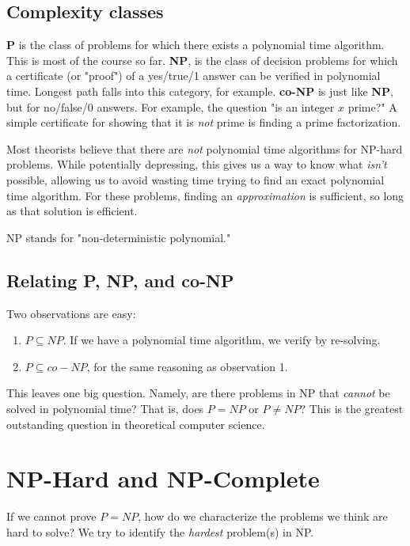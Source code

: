 \documentclass[titlepage, 12pt, leqno]{article}
\begin{document}
\subsection{Complexity classes}
\textbf{P} is the class of problems for which there exists a polynomial time
algorithm. This is most of the course so far. \textbf{NP}, is the class of
decision problems for which a certificate (or "proof") of a yes/true/1 answer
can be verified in polynomial time. Longest path falls into this category, for
example. \textbf{co-NP} is just like \textbf{NP}, but for no/false/0 answers.
For example, the question "is an integer $x$ prime?" A simple certificate for
showing that it is \textit{not} prime is finding a prime factorization.

Most theorists believe that there are \textit{not} polynomial time algorithms
for NP-hard problems. While potentially depressing, this gives us a way to know
what \textit{isn't} possible, allowing us to avoid wasting time trying to find
an exact polynomial time algorithm. For these problems, finding an 
\textit{approximation} is sufficient, so long as that solution is efficient.

\begin{note}
    NP stands for "non-deterministic polynomial."
\end{note}

\subsection{Relating P, NP, and co-NP}
Two observations are easy:
\begin{enumerate}
    \item $P \subseteq NP$. If we have a polynomial time algorithm, we verify
        by re-solving.
    \item $P \subseteq co-NP$, for the same reasoning as observation 1.
\end{enumerate}
This leaves one big question. Namely, are there problems in NP that 
\textit{cannot} be solved in polynomial time? That is, does $P = NP$ or
$P\ne NP$? This is the greatest outstanding question in theoretical computer
science.

\pagebreak
\section{NP-Hard and NP-Complete}
If we cannot prove $P = NP$, how do we characterize the problems we think are
hard to solve? We try to identify the \textit{hardest} problem(s) in NP.
\end{document}
